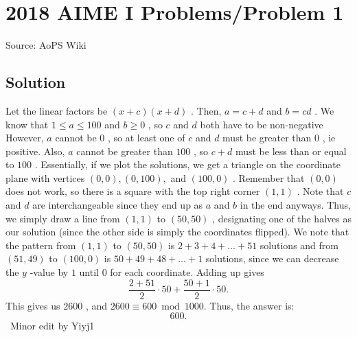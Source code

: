 \documentclass[12pt]{article}
\begin{document}
\section*{{2018 AIME I Problems/Problem 1}}
Source: AoPS Wiki

\subsection*{Solution}
Let the linear factors be $(x+c)(x+d)$ . Then, $a=c+d$ and $b=cd$ . We know that $1\le a\le 100$ and $b\ge 0$ , so $c$ and $d$ both have to be non-negative However, $a$ cannot be $0$ , so at least one of $c$ and $d$ must be greater than $0$ , ie positive. Also, $a$ cannot be greater than $100$ , so $c+d$ must be less than or equal to $100$ . Essentially, if we plot the solutions, we get a triangle on the coordinate plane with vertices $(0,0), (0, 100),$ and $(100,0)$ . Remember that $(0,0)$ does not work, so there is a square with the top right corner $(1,1)$ . Note that $c$ and $d$ are interchangeable since they end up as $a$ and $b$ in the end anyways. Thus, we simply draw a line from $(1,1)$ to $(50,50)$ , designating one of the halves as our solution (since the other side is simply the coordinates flipped). We note that the pattern from $(1,1)$ to $(50,50)$ is $2+3+4+\dots+51$ solutions and from $(51, 49)$ to $(100,0)$ is $50+49+48+\dots+1$ solutions, since we can decrease the $y$ -value by $1$ until $0$ for each coordinate. Adding up gives \[\dfrac{2+51}{2}\cdot 50+\dfrac{50+1}{2}\cdot 50.\] This gives us $2600$ , and $2600\equiv 600 \bmod{1000}.$ Thus, the answer is: \[\boxed{600}.\] ~Minor edit by Yiyj1
\end{document}
